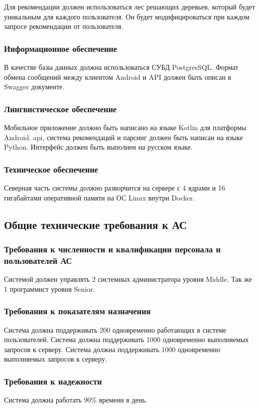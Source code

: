 Для рекомендации должен использоваться лес решающих деревьев, который будет уникальным для каждого пользователя.
Он будет модифицироваться при каждом запросе рекомендации от пользователя.

\subsubsection{Информационное обеспечение}
В качестве базы данных должна использоваться СУБД PostgresSQL\@.
Формат обмена сообщений между клиентом Android и API должен быть описан в Swagger документе.

\subsubsection{Лингвистическое обеспечение}
Мобильное приложение должно быть написано на языке Kotlin для платформы Android.
api, система рекомендаций и парсинг должен быть написан на языке Python.
Интерфейс должен быть выполнен на русском языке.

\subsubsection{Техническое обеспечение}
Северная часть системы должно разворчится на сервере с 4 ядрами и 16 гигабайтами оперативной памяти на ОС Linux внутри 
Docker.

\subsection{Общие технические требования к АС}
\subsubsection{Требования к численности и квалификации персонала и пользователей АС}
Системой должен управлять 2 системных администратора уровня Middle.
Так же 1 программист уровня Senior.


\subsubsection{Требования к показателям назначения}
Система должна поддерживать 200 одновременно работающих в системе пользователей.
Система должна поддерживать 1000 одновременно выполняемых запросов к серверу.
Система должна поддерживать 1000 одновременно выполняемых запросов к серверу.

\subsubsection{Требования к надежности}
Система должна работать 90\% времени в день.

